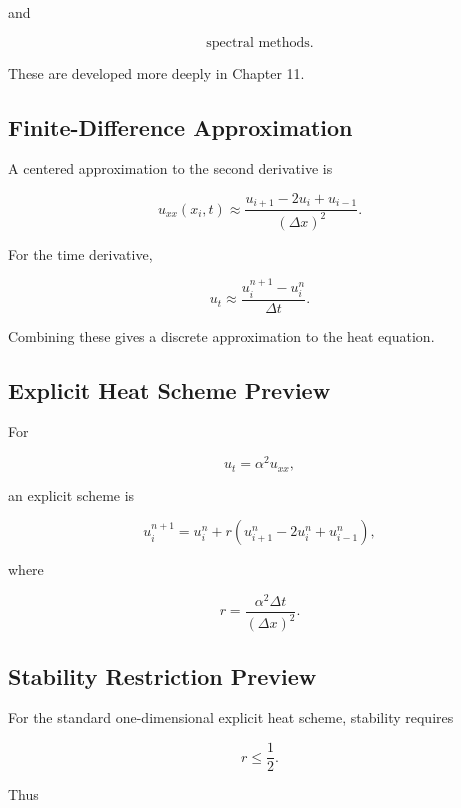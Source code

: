 and

\[
\boxed{
\text{spectral methods}.
}
\]

These are developed more deeply in Chapter 11.

\subsection{Finite-Difference Approximation}
\label{subsec:finite-difference-pde}

A centered approximation to the second derivative is

\[
\boxed{
u_{xx}(x_i,t)
\approx
\frac{
u_{i+1}-2u_i+u_{i-1}
}{
(\Delta x)^2
}.
}
\]

For the time derivative,

\[
\boxed{
u_t
\approx
\frac{
u_i^{n+1}-u_i^n
}{
\Delta t
}.
}
\]

Combining these gives a discrete approximation to the heat equation.

\subsection{Explicit Heat Scheme Preview}
\label{subsec:explicit-heat-scheme}

For

\[
u_t=\alpha^2u_{xx},
\]

an explicit scheme is

\[
\boxed{
u_i^{n+1}
=
u_i^n
+
r
\left(
u_{i+1}^n
-
2u_i^n
+
u_{i-1}^n
\right),
}
\]

where

\[
\boxed{
r
=
\frac{
\alpha^2\Delta t
}{
(\Delta x)^2
}.
}
\]

\subsection{Stability Restriction Preview}
\label{subsec:heat-cfl-preview}

For the standard one-dimensional explicit heat scheme, stability requires

\[
\boxed{
r
\leq
\frac12.
}
\]

Thus

